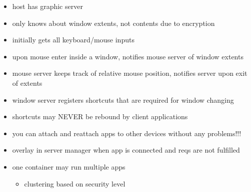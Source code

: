 \begin{itemize}
    \item host has graphic server
    \item only knows about window extents, not contents due to encryption
    \item initially gets all keyboard/mouse inputs
    \item upon mouse enter inside a window, notifies mouse server of window extents
    \item mouse server keeps track of relative mouse position, notifies server upon exit of extents
    \item window server registers shortcuts that are required for window changing
    \item shortcuts may NEVER be rebound by client applications

    \item you can attach and reattach apps to other devices without any problems!!!
    \item overlay in server manager when app is connected and reqs are not fulfilled
    \item one container may run multiple apps
        \begin{itemize}
            \item clustering based on security level
        \end{itemize}
\end{itemize}

